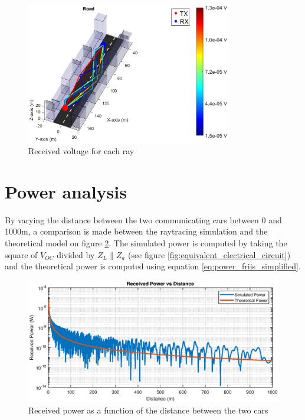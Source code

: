 \documentclass[10pt,a4paper]{ULBreport}
\begin{document}
\begin{figure}[H]
    \centering
    \includegraphics[width=0.8\textwidth]{3_2.eps}
    \caption{Received voltage for each ray}
    \label{fig:voltageDemo}
\end{figure}

\section{Power analysis}
\label{sec:power_analysis}

By varying the distance between the two communicating cars between 0 and 1000m, a comparison is made between the raytracing simulation and the theoretical model on figure \ref{fig:P_RX(d)}. The simulated power is computed by taking the square of $V_{OC}$ divided by $Z_L \mathbin{\|} Z_a$ (see figure \ref{fig:equivalent_electrical_circuit}) and the theoretical power is computed using equation \ref{eq:power_friis_simplified}.

\begin{figure}[H]
    \centering
    \includegraphics[width=1\textwidth]{3_3.eps}
    \caption{Received power as a function of the distance between the two cars}
    \label{fig:P_RX(d)}
\end{figure}
\end{document}
